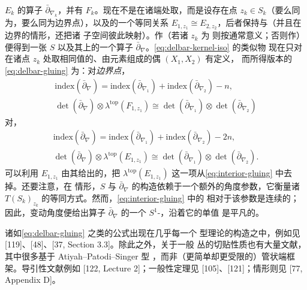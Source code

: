 \trVectorBundle{} $E_k$ 的算子 $\bar{\partial}_{\nabla_k}$，并有\trLagrange\trSubbundle
$F_k$。现在不是在诸端处取\trAsymptotic{}\trIsomorphism，而是设存在点
$z_k\in S_k$（要么同为\trInteriorPoint，要么同为边界点），以及\trFiber{}的一个等同关系
$E_{1,z_1}\cong E_{2,z_2}$，后者保持\trSymplecticStructure{}与\trComplexStructure{}（并且在边界的情形，还把诸%
\trLagrange{}子空间彼此映射）。作\trConnectedSum（若诸 $z_k$ 为\trInteriorPoint{}
则按通常意义；否则作\trBoundaryConnectedSum）便得到一张\trRiemann\trSurface{} $S$
以及其上的一个算子 $\bar{\partial}_{\nabla}$。\eqref{eq:delbar-kernel-iso} 的类似物
现在只对在诸点 $z_k$ 处取相同值的、由\trKernel{}元素组成的偶 $(X_1,X_2)$ 有定义，
而所得版本的\eqref{eq:delbar-gluing} 为：对\emph{边界点}，
\begin{equation}\label{eq:boundary-gluing}
\begin{gathered}
\mathrm{index}(\bar{\partial}_{\nabla})=\mathrm{index}(\bar{\partial}_{\nabla_1})+
\mathrm{index}(\bar{\partial}_{\nabla_2})-n,\\
\det(\bar{\partial}_{\nabla})\otimes\lambda^{\mathrm{top}}(F_{1,z_1})\cong
\det(\bar{\partial}_{\nabla_1})\otimes\det(\bar{\partial}_{\nabla_2})
\end{gathered}
\end{equation}
对\emph{\trInteriorPoint}，
\begin{equation}\label{eq:interior-gluing}
\begin{gathered}
\mathrm{index}(\bar{\partial}_{\nabla})=\mathrm{index}(\bar{\partial}_{\nabla_1})+
\mathrm{index}(\bar{\partial}_{\nabla_2})-2n,\\
\det(\bar{\partial}_{\nabla})\otimes\lambda^{\mathrm{top}}(E_{1,z_1})\cong
\det(\bar{\partial}_{\nabla_1})\otimes\det(\bar{\partial}_{\nabla_2}).
\end{gathered}
\end{equation}
可以利用 $E_{1,z_1}$ 由其\trSymplecticForm{}给出的\trOrientation，把 $\lambda^{\mathrm{top}}
(E_{1,z_1})$ 这一项从\eqref{eq:interior-gluing} 中去掉。还要注意，在\trInteriorPoint{}
情形，$S$ 与 $\bar{\partial}_{\nabla}$ 的构造依赖于一个额外的角度参数，它衡量诸%
\trTangentSpace{} $T(S_k)_{z_k}$ 的等同方式。然而，\eqref{eq:interior-gluing} 中的%
\trIsomorphism{}相对于该参数是连续的；因此，变动角度便给出算子 $\bar{\partial}_
{\nabla}$ 的一个 $S^1$-\trFamily，沿着它\trDeterminantLine{}\trLineBundle{}的单值
是平凡的。
\begin{remark}\label{thm:delbar-gluing-references}
诸如\eqref{eq:delbar-gluing} 之类的\trGluing{}公式出现在几乎每一个 \trFloerHomology
型理论的构造之中，例如见 [119]、[48]、[37, Section 3.3]。除此之外，关于一般%
\trDeterminantLine{}丛的切贴性质也有大量文献，其中很多基于 Atiyah--Patodi--Singer 型%
\trBoundaryCondition，而非（更简单却更受限的）管状端框架。导引性文献例如
[122, Lecture 2]；一般性定理见 [105]、[121]；\trRiemann\trSurface{}情形则见
[77, Appendix D]。
\end{remark}
